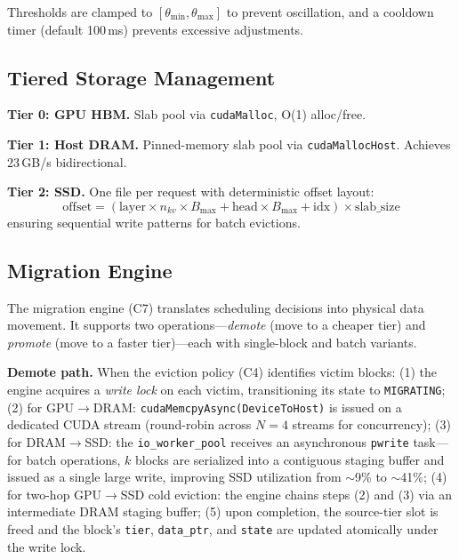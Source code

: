 \documentclass[conference]{IEEEtran}
\begin{document}
Thresholds are clamped to $[\theta_{\min}, \theta_{\max}]$ to prevent oscillation, and a cooldown timer (default 100\,ms) prevents excessive adjustments.

\subsection{Tiered Storage Management}
\label{sec:tiered-storage}

\textbf{Tier 0: GPU HBM.} Slab pool via \texttt{cudaMalloc}, O(1) alloc/free.

\textbf{Tier 1: Host DRAM.} Pinned-memory slab pool via \texttt{cudaMallocHost}. Achieves 23\,GB/s bidirectional.

\textbf{Tier 2: SSD.} One file per request with deterministic offset layout:
\begin{equation}
\text{offset} = (\text{layer} \times n_{kv} \times B_{\max} + \text{head} \times B_{\max} + \text{idx}) \times \text{slab\_size}
\end{equation}
ensuring sequential write patterns for batch evictions.

\subsection{Migration Engine}

The migration engine (C7) translates scheduling decisions into physical data movement. It supports two operations---\emph{demote} (move to a cheaper tier) and \emph{promote} (move to a faster tier)---each with single-block and batch variants.

\textbf{Demote path.} When the eviction policy (C4) identifies victim blocks: (1) the engine acquires a \emph{write lock} on each victim, transitioning its state to \texttt{MIGRATING}; (2) for GPU$\to$DRAM: \texttt{cudaMemcpyAsync(DeviceToHost)} is issued on a dedicated CUDA stream (round-robin across $N{=}4$ streams for concurrency); (3) for DRAM$\to$SSD: the \texttt{io\_worker\_pool} receives an asynchronous \texttt{pwrite} task---for batch operations, $k$ blocks are serialized into a contiguous staging buffer and issued as a single large write, improving SSD utilization from ${\sim}$9\% to ${\sim}$41\%; (4) for two-hop GPU$\to$SSD cold eviction: the engine chains steps (2) and (3) via an intermediate DRAM staging buffer; (5) upon completion, the source-tier slot is freed and the block's \texttt{tier}, \texttt{data\_ptr}, and \texttt{state} are updated atomically under the write lock.
\end{document}
